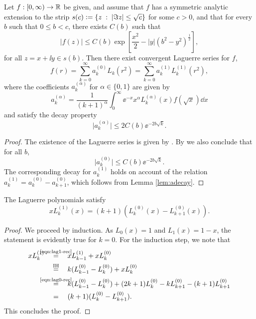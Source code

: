 \begin{proposition} \label{prop:szasz}
Let $f:[0,\infty)\to\mathbb{R}$ be given, and assume that $f$ has a symmetric analytic extension to the
strip $s(c) \vcentcolon= \left\{ z \;:\; |\Im z| \leq \sqrt{c} \right\}$ for some $c>0$, and that for every $b$ such
that $0 \leq b<c$, there exists $C(b)$ such that
\begin{equation} \label{eqn:sz-slowdecay}
    |f(z)| \leq C(b) \exp\left[\frac{x^2}{2} - |y|\left(b^2 - y^2\right)^{\frac{1}{2}}\right],
\end{equation}
for all $z = x + \ii y \in s(b)$. Then there exist convergent Laguerre series for $f$,
\[
    f(r) = \sum_{k=0}^\infty a^{(0)}_k L_k(r^2) = \sum_{k=0}^\infty a^{(1)}_k L^{(1)}_k(r^2),
\]
where the coefficients $a^{(\alpha)}_k$ for $\alpha\in\{0,1\}$ are given by
\[
    a^{(\alpha)}_k = \frac{1}{(k+1)^\alpha}\int_0^\infty \ee^{-x} x^\alpha L^{(\alpha)}_k(x)f(\sqrt{x})\dd x
\]
and satisfy the decay property
\[
    \big|a^{(\alpha)}_k\big| \leq 2 C(b) \ee^{-2b\sqrt{k}}.
\]
\end{proposition}
\begin{proof}
The existence of the Laguerre series is given by \cite[Theorem B]{Szasz58}.  By \cite[Lemma 3.4]{Szasz58} we
also conclude that for all $b$,
\[
    \big|a^{(0)}_k\big| \leq C(b) \ee^{-2b\sqrt{k}}.
\]
The corresponding decay for $a^{(1)}_k$ holds on account of the relation $a^{(1)}_k = a^{(0)}_k -
a^{(0)}_{k+1}$, which follows from Lemma \ref{lem:adecay}.
\end{proof}
\begin{lemma} \label{lem:adecay}
The Laguerre polynomials satisfy
\[
    xL^{(1)}_k(x) = (k+1)(L^{(0)}_k(x)-L^{(0)}_{k+1}(x)).
\]
\end{lemma}
\begin{proof}
We proceed by induction. As $L_0(x)=1$ and $L_1(x)=1-x$, the statement is evidently true for $k=0$. For the
induction step, we note that
\begin{align*}
    xL^{(1)}_k 
    & \quad \overset{\mathclap{\text{\eqref{eqn:lag1-rec}}}}{=} \quad
    xL^{(1)}_{k-1} + xL^{(0)}_k \\
    & \quad \overset{\mathclap{\text{IH}}}{=} \quad
    k(L^{(0)}_{k-1} - L^{(0)}_k) + xL^{(0)}_k \\
    & \quad \overset{\mathclap{\text{\eqref{eqn:lag0-rec}}}}{=} \quad
    k(L^{(0)}_{k-1} - L^{(0)}_k) + (2k+1)L^{(0)}_k - kL^{(0)}_{k+1} - (k+1)L^{(0)}_{k+1} \\
    & \quad = \quad (k+1)(L^{(0)}_k-L^{(0)}_{k+1}).
\end{align*}
This concludes the proof.
\end{proof}

